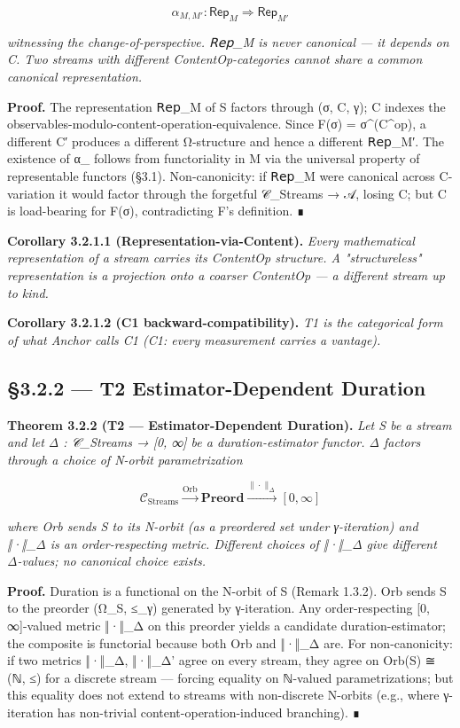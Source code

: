 \documentclass[11pt, openany]{book}
\begin{document}
\[
\alpha_{M,M'} : \mathsf{Rep}_M \Rightarrow \mathsf{Rep}_{M'}
\]

\textit{witnessing the change-of-perspective. 𝖱𝖾𝗉\_\allowbreak{}M is never canonical --- it depends on C. Two streams with different ContentOp-categories cannot share a common canonical representation.}

\textbf{Proof.} The representation 𝖱𝖾𝗉\_\allowbreak{}M of S factors through (σ, C, γ); C indexes the observables-modulo-content-operation-equivalence. Since F(σ) = σ\textasciicircum{}(C\textasciicircum{}op), a different C′ produces a different Ω-structure and hence a different 𝖱𝖾𝗉\_\allowbreak{}M′. The existence of α\_ follows from functoriality in M via the universal property of representable functors (§3.1). Non-canonicity: if 𝖱𝖾𝗉\_\allowbreak{}M were canonical across C-variation it would factor through the forgetful 𝒞\_\allowbreak{}Streams → 𝒜, losing C; but C is load-bearing for F(σ), contradicting F's definition. ∎

\textbf{Corollary 3.2.1.1 (Representation-via-Content).} \textit{Every mathematical representation of a stream carries its ContentOp structure. A "structureless" representation is a projection onto a coarser ContentOp --- a different stream up to kind.}

\textbf{Corollary 3.2.1.2 (C1 backward-compatibility).} \textit{T1 is the categorical form of what Anchor calls C1 (C1: every measurement carries a vantage).}

\subsection{§3.2.2 --- T2 Estimator-Dependent Duration}

\textbf{Theorem 3.2.2 (T2 --- Estimator-Dependent Duration).} \textit{Let S be a stream and let Δ : 𝒞\_\allowbreak{}Streams → [0, ∞] be a duration-estimator functor. Δ factors through a choice of N-orbit parametrization}

\[
\mathcal{C}_\mathrm{Streams} \xrightarrow{\mathrm{Orb}} \mathbf{Preord} \xrightarrow{\|\cdot\|_\Delta} [0, \infty]
\]

\textit{where Orb sends S to its N-orbit (as a preordered set under γ-iteration) and ‖·‖\_\allowbreak{}Δ is an order-respecting metric. Different choices of ‖·‖\_\allowbreak{}Δ give different Δ-values; no canonical choice exists.}

\textbf{Proof.} Duration is a functional on the N-orbit of S (Remark 1.3.2). Orb sends S to the preorder (Ω\_\allowbreak{}S, ≤\_\allowbreak{}γ) generated by γ-iteration. Any order-respecting [0, ∞]-valued metric ‖·‖\_\allowbreak{}Δ on this preorder yields a candidate duration-estimator; the composite is functorial because both Orb and ‖·‖\_\allowbreak{}Δ are. For non-canonicity: if two metrics ‖·‖\_\allowbreak{}Δ, ‖·‖\_\allowbreak{}Δ' agree on every stream, they agree on Orb(S) ≅ (ℕ, ≤) for a discrete stream --- forcing equality on ℕ-valued parametrizations; but this equality does not extend to streams with non-discrete N-orbits (e.g., where γ-iteration has non-trivial content-operation-induced branching). ∎
\end{document}
